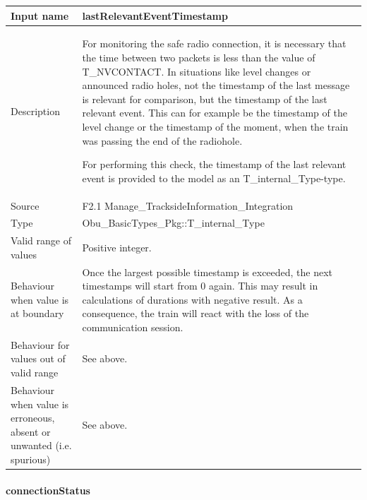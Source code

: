 \begin{longtable}{p{}p{}}
\toprule
Input name				& lastRelevantEventTimestamp \\
\midrule
Description				& For monitoring the safe radio connection, it is necessary that the time between two packets is less than the value of {T\_NVCONTACT}.\newline
In situations like level changes or announced radio holes, not the timestamp of the last message is relevant for comparison, but the timestamp of the last relevant event. This can for example be the timestamp of the level change or the timestamp of the moment, when the train was passing the end of the radiohole.

For performing this check, the timestamp of the last relevant event is provided to the model as an {T\_internal\_Type}-type. \\
\midrule
Source					& F2.1 Manage\_TracksideInformation\_Integration\\ 
\midrule
Type					& Obu\_BasicTypes\_Pkg::T\_internal\_Type \\
\midrule
Valid range of values	& Positive integer.\\
\midrule
Behaviour when value is at boundary	& Once the largest possible timestamp is exceeded, the next timestamps will start from 0 again. This may result in calculations of durations with negative result. As a consequence, the train will react with the loss of the communication session.\\
\midrule
Behaviour for values out of valid range	& See above.\\
\midrule
Behaviour when value is erroneous, absent or unwanted (i.e. spurious) & See above.\\
\bottomrule
\end{longtable}


\paragraph{connectionStatus}

